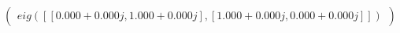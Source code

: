 \documentclass[border=1em]{standalone}
\begin{document}
$
\left(
\begin{array}{cc}
e
i
g
(
[
[
0
.
0
0
0
+
0
.
0
0
0
j
,
 
1
.
0
0
0
+
0
.
0
0
0
j
]
,
[
1
.
0
0
0
+
0
.
0
0
0
j
,
 
0
.
0
0
0
+
0
.
0
0
0
j
]
]
)
\end{array}
\right)
$
\end{document}
